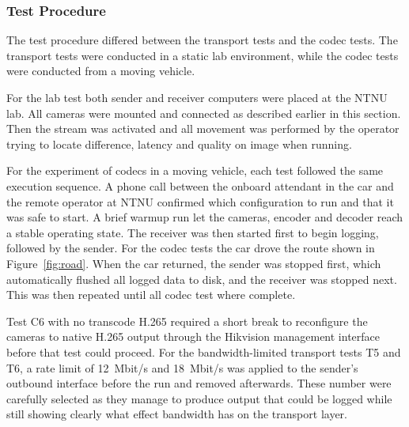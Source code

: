 




\subsubsection{Test Procedure}
The test procedure differed between the transport tests and the codec tests. The transport tests were conducted in a static lab environment, while the codec tests were conducted from a moving vehicle.

For the lab test both sender and receiver computers were placed at the NTNU lab. All cameras
were mounted and connected as described earlier in this section. Then the stream was activated and all movement was performed by the operator trying to locate difference, latency and quality on image when running.

For the experiment of codecs in a moving vehicle, each test followed the same execution sequence. A phone call between the onboard attendant in the car and the remote operator at NTNU confirmed which configuration to run and that it was safe to start. A brief warmup run let the cameras, encoder and decoder reach a stable operating state. The receiver was then started first to begin logging, followed by the sender. For the codec tests the car drove the route shown in Figure~\ref{fig:road}. When the car returned, the sender was stopped first, which automatically flushed all logged data to disk, and the receiver was stopped next. This was then repeated until all codec test where complete.

Test C6 with no transcode H.265 required a short break to reconfigure the cameras to native H.265 output through the Hikvision management interface before that test could proceed. For the bandwidth-limited transport tests T5 and T6, a rate limit of 12~Mbit/s and 18~Mbit/s was applied to the sender's outbound interface before the run and removed afterwards. These number were carefully selected as they manage to produce output that could be logged while still showing clearly what effect bandwidth has on the transport layer.


